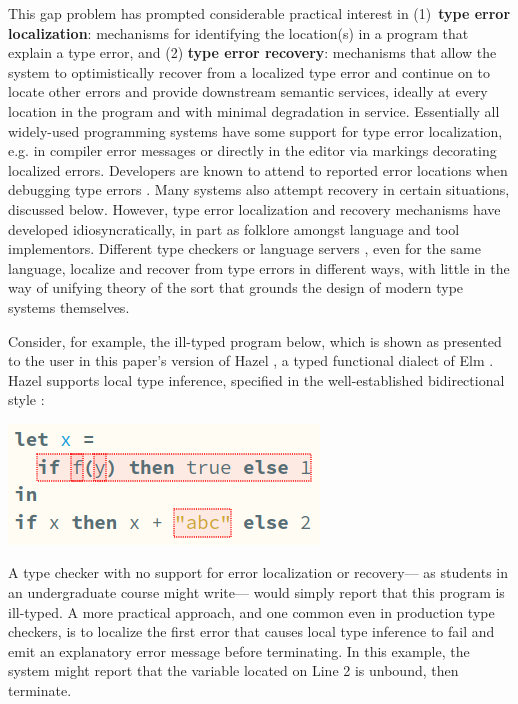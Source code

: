 This gap problem has prompted considerable practical interest in 
(1)~\textbf{type error localization}: mechanisms for identifying the location(s) in a program that explain a type error, and 
(2) \textbf{type error recovery}: mechanisms that allow the system to optimistically recover from a localized type error 
and continue on to locate other errors and provide downstream semantic services, 
ideally at every location in the program and with minimal degradation in service.
Essentially all widely-used programming systems have some support for type error localization, 
e.g. in compiler error messages 
or directly in the editor via markings decorating localized errors. Developers are known to attend to reported error locations when debugging type errors \cite{DBLP:journals/jfp/JoostenBH93}.
Many systems also attempt recovery in certain situations, discussed below. 
However, type error localization and recovery mechanisms have developed idiosyncratically, 
in part as folklore amongst language and tool implementors. 
Different type checkers or language servers \cite{barros2022editing,bour2018merlin}, even for the same language, localize and recover from type errors in different ways, 
with little in the way of unifying theory of the sort that grounds the design of modern type systems themselves.

Consider, for example, the ill-typed program below, which is shown as presented to the user in
this paper's version of Hazel \cite{hazel}, a typed functional dialect of Elm \cite{elm}. Hazel  
supports local type inference, specified in the well-established bidirectional style \cite{Localinf,HazelnutPOPL,BidirTyping}:
\vspace{-3px}
\begin{center}
    \includegraphics[scale=0.5]{images/hazel-intro-screenshot-v3.png}
\end{center}
\vspace{-3px}
A type checker with no support for error localization or recovery---%
as students in an undergraduate course might write---%
would simply report that this program is ill-typed. 
A more practical approach, and one common even in production type checkers, 
is to localize the first error that causes local type inference to fail and emit an explanatory error message before terminating.
In this example, the system might report that the variable  located on Line 2 is unbound, then terminate.

